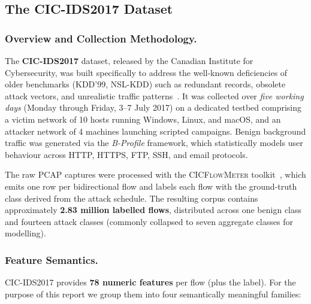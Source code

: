 \subsection{The CIC-IDS2017 Dataset}
\label{sec:bg-dataset}

\subsubsection*{Overview and Collection Methodology.}
The \textbf{CIC-IDS2017} dataset, released by the Canadian Institute for Cybersecurity, was built specifically to address the well-known deficiencies of older benchmarks (KDD'99, NSL-KDD) such as redundant records, obsolete attack vectors, and unrealistic traffic patterns~\cite{ref_cicids2017,ref_kdd99}. It was collected over \emph{five working days} (Monday through Friday, 3--7 July 2017) on a dedicated testbed comprising a victim network of 10 hosts running Windows, Linux, and macOS, and an attacker network of 4 machines launching scripted campaigns. Benign background traffic was generated via the \emph{B-Profile} framework, which statistically models user behaviour across HTTP, HTTPS, FTP, SSH, and email protocols.

The raw PCAP captures were processed with the \textsc{CICFlowMeter} toolkit~\cite{ref_cicflowmeter}, which emits one row per bidirectional flow and labels each flow with the ground-truth class derived from the attack schedule. The resulting corpus contains approximately \textbf{2.83 million labelled flows}, distributed across one benign class and fourteen attack classes (commonly collapsed to seven aggregate classes for modelling).

\subsubsection*{Feature Semantics.}
CIC-IDS2017 provides \textbf{78 numeric features} per flow (plus the label). For the purpose of this report we group them into four semantically meaningful families:

